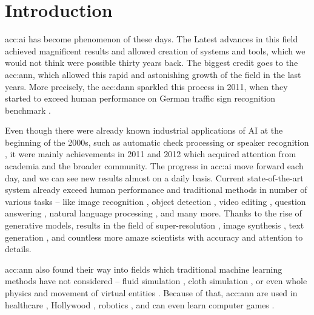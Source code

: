 \chapter{Introduction}
\label{chap:intro}

\acrfull{acc:ai} has become phenomenon of these days. The Latest advances in this field achieved magnificent results and allowed creation of systems and tools, which we would not think were possible thirty years back. The biggest credit goes to the \acrfull{acc:ann}, which allowed this rapid and astonishing growth of the field in the last years. More precisely, the \acrfull{acc:dann} sparkled this process in 2011, when they started to exceed human performance on German traffic sign recognition benchmark \citep{CIRESAN2012333}.

Even though there were already known industrial applications of AI at the beginning of the 2000s, such as automatic check processing \citep{ChecksDocumentRecognition} or speaker recognition \citep{HECK2000181}, it were mainly achievements in 2011 and 2012 which acquired attention from academia and the broader community. The progress in \acrshort{acc:ai} move forward each day, and we can see new results almost on a daily basis. Current state-of-the-art system already exceed human performance and traditional methods in number of various tasks -- like 
image recognition \citep{pham2021meta}\citep{ZawadzkaGosk2019},
object detection \citep{ghiasi2020simple}\citep{lehner2019patch},
video editing \citep{lu2020layered},
question answering \citep{zhang2020pushing}\citep{yamada2020luke},
natural language processing \citep{gpt3},
and many more. Thanks to the rise of generative models, results in the field of
super-resolution \citep{Sun_2020}\allowbreak\citep{Chadha_2020},
image synthesis \citep{StateOfTheArtImageSythesis}\allowbreak\citep{esser2020taming}\allowbreak\citep{dalle},
text generation \citep{gpt3}\allowbreak\citep{malmi2019encode},
and countless more amaze scientists with accuracy and attention to details.

\acrshort{acc:ann} also found their way into fields which traditional machine learning methods have not considered -- fluid simulation \citep{um2018liquid}\citep{Kim_2019}, cloth simulation \citep{lee2019efficient}\citep{SRBO20}, or even whole physics \citep{PhysicsSimulation}\citep{sanchezgonzalez2020learning} and movement of virtual entities \citep{PhysicsBasedCharaterSImulation}\citep{zhang2020vid2player}. Because of that, \acrshort{acc:ann} are used in 
healthcare \citep{fakoor2013using}\allowbreak\citep{BreastCancerAISystem},
Hollywood \citep{aiinhollywood},
robotics \citep{pierson2017deep}\allowbreak\citep{Lee_2020},
and can even learn computer games \citep{openai2019dota}\allowbreak\citep{alphastar}.

